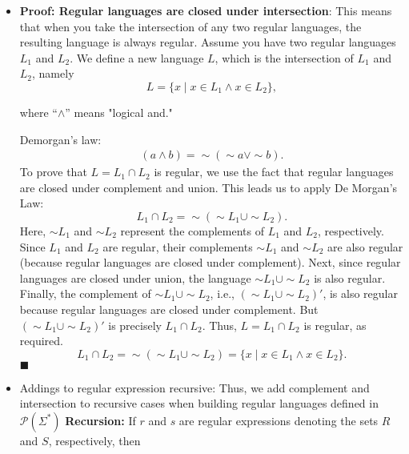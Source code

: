 \documentclass{report}
\begin{document}
\begin{itemize}
        \item \textbf{Proof: Regular languages are closed under intersection}: This means that when you take the intersection of any two regular languages, the resulting language is always regular.
            \bigbreak \noindent 
            Assume you have two regular languages \(L_1\) and \(L_2\).
            \bigbreak \noindent 
            We define a new language \(L\), which is the intersection of \(L_1\) and \(L_2\), namely
            \[
                L = \{x \mid x \in L_1 \land x \in L_2\},
            \]
            \begin{center}
                where ``\(\land\)'' means "logical and."
            \end{center}
            \bigbreak \noindent 
            Demorgan's law:
            \begin{align*}
                (a \land b) = \sim(\sim a \lor \sim b)
            .\end{align*}
            \bigbreak \noindent 
            To prove that \(L = L_1 \cap L_2\) is regular, we use the fact that regular languages are closed under complement and union. This leads us to apply De Morgan's Law:
            \[
                L_1 \cap L_2 = \sim (\sim L_1 \cup \sim L_2).
            \]
            \bigbreak \noindent 
            Here, \(\sim L_1\) and \(\sim L_2\) represent the complements of \(L_1\) and \(L_2\), respectively. Since \(L_1\) and \(L_2\) are regular, their complements \(\sim L_1\) and \(\sim L_2\) are also regular (because regular languages are closed under complement).
            \bigbreak \noindent 
            Next, since regular languages are closed under union, the language \(\sim L_1 \cup \sim L_2\) is also regular.
            \bigbreak \noindent 
            Finally, the complement of \(\sim L_1 \cup \sim L_2\), i.e., \((\sim L_1 \cup \sim L_2)'\), is also regular because regular languages are closed under complement. But \((\sim L_1 \cup \sim L_2)'\) is precisely \(L_1 \cap L_2\).
            \bigbreak \noindent 
            Thus, \(L = L_1 \cap L_2\) is regular, as required.
            \[
                L_1 \cap L_2 = \sim (\sim L_1 \cup \sim L_2) = \{x \mid x \in L_1 \land x \in L_2\}.
            \]
            \bigbreak \noindent 
            \(\blacksquare\)
        \item {Addings to regular expression recursive}: Thus, we add complement and intersection to recursive cases when building regular languages defined in $\mathcal{P}(\Sigma^{*})$
            \bigbreak \noindent 
            \textbf{Recursion:} If $r$ and $s$ are regular expressions denoting the sets $R$ and $S$, respectively, then

\end{itemize}
\end{document}
